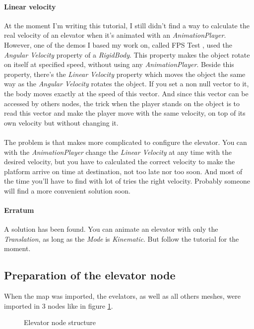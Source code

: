 \documentclass[10pt,a4paper]{article}
\begin{document}
\paragraph{Linear velocity}
At the moment I'm writing this tutorial, I still didn't find a way to calculate the real velocity of an elevator when it's animated with an \textit{AnimationPlayer}. However, one of the demos I based my work on, called FPS Test \cite{FPSTest}, used the \textit{Angular Velocity} property of a \textit{RigidBody}. This property makes the object rotate on itself at specified speed, without using any \textit{AnimationPlayer}. Beside this property, there's the \textit{Linear Velocity} property which moves the object the same way as the \textit{Angular Velocity} rotates the object. If you set a non null vector to it, the body moves exactly at the speed of this vector. And since this vector can be accessed by others nodes, the trick when the player stands on the object is to read this vector and make the player move with the same velocity, on top of its own velocity but without changing it.\\
\\
The problem is that makes more complicated to configure the elevator. You can with the \textit{AnimationPlayer} change the \textit{Linear Velocity} at any time with the desired velocity, but you have to calculated the correct velocity to make the platform arrive on time at destination, not too late nor too soon. And most of the time you'll have to find with lot of tries the right velocity. Probably someone will find a more convenient solution soon.

\paragraph{Erratum}
A solution has been found. You can animate an elevator with only the \textit{Translation}, as long as the \textit{Mode} is \textit{Kinematic}. But follow the tutorial for the moment.

\subsection{Preparation of the elevator node}
When the map was imported, the evelators, as well as all others meshes, were imported in 3 nodes like in figure \ref{fig:col_node_structure}.

\begin{figure}[H]
\centering
{}
\caption{Elevator node structure}
\label{fig:col_node_structure}
\end{figure}
\end{document}
